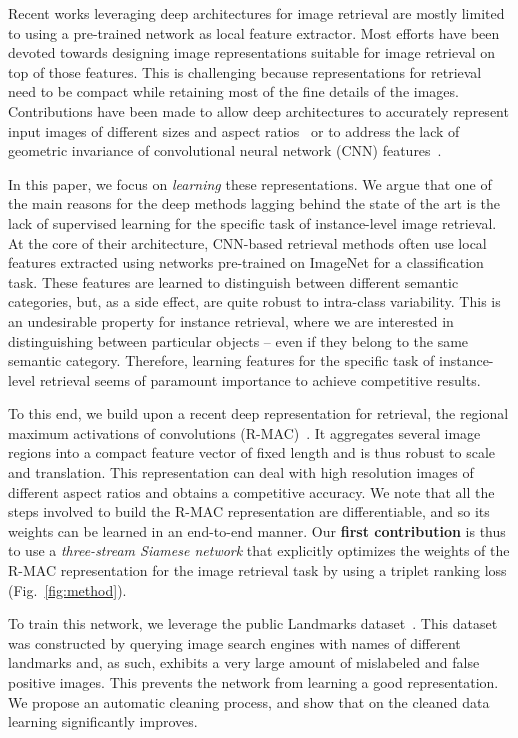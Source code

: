 \documentclass[runningheads]{llncs}
\begin{document}
Recent works leveraging deep architectures for image retrieval are mostly limited to using a pre-trained network as local feature extractor. Most efforts have been devoted towards designing image representations suitable for image retrieval on top of those features.
This is challenging because representations for retrieval need to be compact while retaining most of the fine details of the images.
Contributions have been made to allow deep architectures to accurately represent input images of different sizes
and aspect ratios~\cite{Babenko2015,Kalantidis2015,Tolias2016} or to address the lack of geometric invariance of
convolutional neural network (CNN) features~\cite{Gong2014,Razavian2014}.

In this paper, we focus on \emph{learning} these representations. We argue that one of the main reasons for
the deep methods lagging behind the state of the art is the lack of supervised learning for the specific task of instance-level image retrieval.
At the core of their architecture, CNN-based retrieval methods often use local features extracted using networks
pre-trained on ImageNet for a classification task. These features are learned to distinguish between different semantic
categories, but, as a side effect, are quite robust to intra-class variability.  This is an undesirable
property for instance retrieval, where we are interested in distinguishing between particular objects -- even if
they belong to the same semantic category.  Therefore, learning features for the specific task of instance-level retrieval seems of paramount importance to achieve competitive results.

To this end, we build upon a recent deep representation for retrieval, the regional maximum activations of convolutions (R-MAC)~\cite{Tolias2016}. 
It aggregates several image regions into a compact feature vector of fixed length and is thus robust to scale and translation.
This representation can deal with high resolution images of different aspect ratios and obtains a competitive accuracy.
We note that all the steps involved to build the R-MAC representation are differentiable, and so its weights can be learned in an end-to-end manner.
Our \textbf{first contribution} is thus to use a \textit{three-stream Siamese network} that explicitly optimizes the weights of the R-MAC representation for the image retrieval task by using a triplet ranking loss (Fig.~\ref{fig:method}).

To train this network, we leverage the public Landmarks dataset~\cite{Babenko2014}. 
This dataset was constructed by querying image search engines with names of different landmarks and, as such, exhibits a very large amount of mislabeled and false positive images. This prevents the network from learning a good representation. 
We propose an automatic cleaning process, and show that on the cleaned data learning significantly improves.
\end{document}

